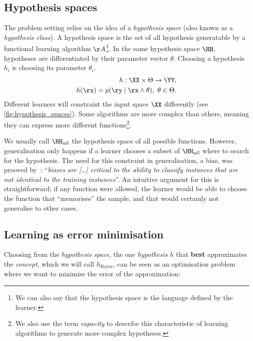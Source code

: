 \subsection{Hypothesis spaces}\label{sec:hypothesis_space}

The problem setting relies on the idea of a \emph{hypothesis space} (also known as a \emph{hypothesis class}). A hypothesis space is the set of all hypothesis generatable by a functional learning algorithm \( \AA\)\footnote{We can also say that the hypothesis space is the language defined by the learner.}. In the same hypothesis space \(\HH\), hypotheses are differentiated by their parameter vector \(\theta\). Choosing a hypothesis \(h_i\) is choosing its parameter \(\theta_i\).
\begin{align}
	h: \XX \times \Theta \to \YY, \\
	h(\rx) = p(\ry \mid \rx \land \theta),~ \theta \in \Theta.
\end{align}
Different learners will constraint the input space \(\XX\) differently (see \cref{fig:hypothesis_spaces}). Some algorithms are more complex than others, meaning they can express more different functions\footnote{We also use the term \emph{capacity} to describe this characteristic of learning algorithms to generate more complex hypotheses.}.

We usually call \(\HH_{all}\) the hypothesis space of all possible functions. However, generalisation only happens if a learner chooses a subset of \(\HH_{all}\) where to search for the hypothesis. The need for this constraint in generalisation, a bias, was prooved by~\citeauthor{mitchell:1980}: ``\emph{biases are [\dots] critical to the ability to classify instances that are not identical to the training instances}''. An intuitive argument for this is straightforward; if any function were allowed, the learner would be able to choose the function that ``memorises'' the sample, and that would certainly not generalise to other cases.

\subsection{Learning as error minimisation} Choosing from the \emph{hypothesis space}, the one \emph{hypothesis} \(h\) that \textbf{best} approximates the \emph{concept}, which we will call \(h_{\text{Bayes}}\), can be seen as an optimisation problem where we want to minimise the error of the approximation:
